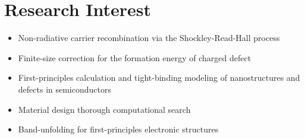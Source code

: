 \hypertarget{research-interest}{%
\section{Research Interest}\label{research-interest}}

\begin{itemize}
\tightlist
\item
  Non-radiative carrier recombination via the Shockley-Read-Hall process
\item
  Finite-size correction for the formation energy of charged defect
\item
  First-principles calculation and tight-binding modeling of
  nanostructures and defects in semiconductors
\item
  Material design thorough computational search
\item
  Band-unfolding for first-principles electronic structures
\end{itemize}
